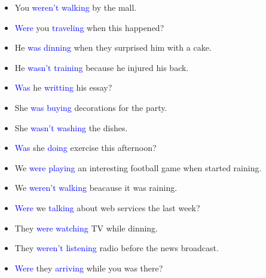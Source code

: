 \begin{multicols}{2}
\begin{itemize}
\item You \textcolor{blue}{weren't walking} by the mall.
\item \textcolor{blue}{Were} you \textcolor{blue}{traveling} when this happened?
\item He \textcolor{blue}{was dinning} when they surprised him with a cake.
\item He \textcolor{blue}{wasn't training} because he injured his back.
\item \textcolor{blue}{Was} he \textcolor{blue}{writting} his essay?
\item She \textcolor{blue}{was buying} decorations for the party.
\item She \textcolor{blue}{wasn't washing} the dishes.
\item \textcolor{blue}{Was} she \textcolor{blue}{doing} exercise this afternoon?
\item We \textcolor{blue}{were playing} an interesting football game when started raining.
\item We \textcolor{blue}{weren't walking} beacause it was raining.
\item \textcolor{blue}{Were} we \textcolor{blue}{talking} about web services the last week?
\item They \textcolor{blue}{were watching} TV while dinning.
\item They \textcolor{blue}{weren't listening} radio before the news broadcast.
\item \textcolor{blue}{Were} they \textcolor{blue}{arriving} while you was there?
\end{itemize}
\end{multicols}

